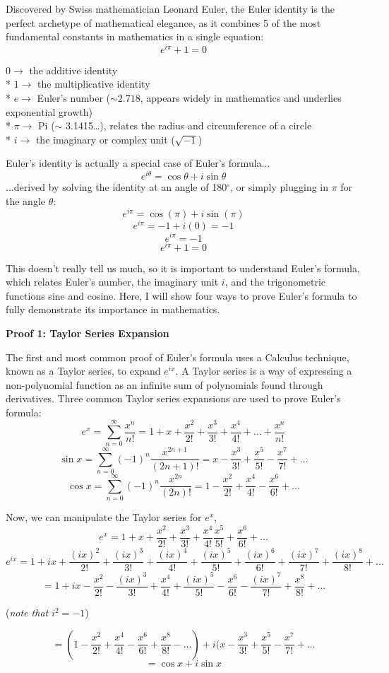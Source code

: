 Discovered by Swiss mathematician Leonard Euler, the Euler identity is the perfect archetype of mathematical elegance, as it combines 5 of the most fundamental constants in mathematics in a single equation:
\[e^{i\pi}+1=0\]

\noindent
$0 \rightarrow$ the additive identity
\\* $1 \rightarrow$ the multiplicative identity
\\* $e \rightarrow$ Euler’s number ($\sim 2.718$, appears widely in mathematics and underlies exponential growth)
\\* $\pi \rightarrow$ Pi ($\sim$ 3.1415…), relates the radius and circumference of a circle
\\* $i \rightarrow$ the imaginary or complex unit ($\sqrt{-1}$)

Euler’s identity is actually a special case of Euler’s formula...
\[e^{i\theta}=\cos\theta + i\sin\theta\]
...derived by solving the identity at an angle of 180$^{\circ}$, or simply plugging in $\pi$ for the angle $\theta$:
\[e^{i\pi}=\cos(\pi) + i\sin(\pi)\]
\[e^{i\pi}=-1+i(0)=-1\]
\[e^{i\pi}=-1\]
\[e^{i\pi}+1=0\]

This doesn’t really tell us much, so it is important to understand Euler’s formula, which relates Euler’s number, the imaginary unit $i$, and the trigonometric functions sine and cosine. Here, I will show four ways to prove Euler’s formula to fully demonstrate its importance in mathematics.

\noindent
\textbf{Proof 1: Taylor Series Expansion}

The first and most common proof of Euler’s formula uses a Calculus technique, known as a Taylor series, to expand $e^{ix}$. A Taylor series is a way of expressing a non-polynomial function as an infinite sum of polynomials found through derivatives. Three common Taylor series expansions are used to prove Euler’s formula:
\[e^{x}=\sum_{n=0}^{\infty} \frac{x^{n}}{n!}  = 1 + x+ \frac{x^2}{2!} + \frac{x^3}{3!} + \frac{x^4}{4!} + ... + \frac{x^n}{n!}\]
\[\sin x=\sum_{n=0}^{\infty} (-1)^n \frac{x^{2n+1}}{(2n+1)!}  = x - \frac{x^3}{3!} + \frac{x^5}{5!} - \frac{x^7}{7!} + ...\]
\[\cos x=\sum_{n=0}^{\infty} (-1)^n \frac{x^{2n}}{(2n)!}  = 1 - \frac{x^2}{2!} + \frac{x^4}{4!} - \frac{x^6}{6!} + ...\]

Now, we can manipulate the Taylor series for $e^x$,
\[e^x=1+x+\frac{x^2}{2!}+\frac{x^3}{3!}+\frac{x^4}{4!}\frac{x^5}{5!}+\frac{x^6}{6!}+...\]
\[e^{ix}=1+ix+\frac{(ix)^2}{2!}+\frac{(ix)^3}{3!}+\frac{(ix)^4}{4!}+\frac{(ix)^5}{5!}+\frac{(ix)^6}{6!}
+\frac{(ix)^7}{7!}+\frac{(ix)^8}{8!}+...\]
\[=1+ix-\frac{x^2}{2!}-\frac{(ix)^3}{3!}+\frac{x^4}{4!}+\frac{(ix)^5}{5!}-\frac{x^6}{6!}-\frac{(ix)^7}{7!}+\frac{x^8}{8!}+...\] 
\begin{center}(\textit{note that $i^2=-1$})\end{center}
\[=(1-\frac{x^2}{2!}+\frac{x^4}{4!}-\frac{x^6}{6!}+\frac{x^8}{8!}-...)+i(x-\frac{x^3}{3!}+\frac{x^5}{5!}-\frac{x^7}{7!}+...\]
\[=\cos x + i\sin x\]

